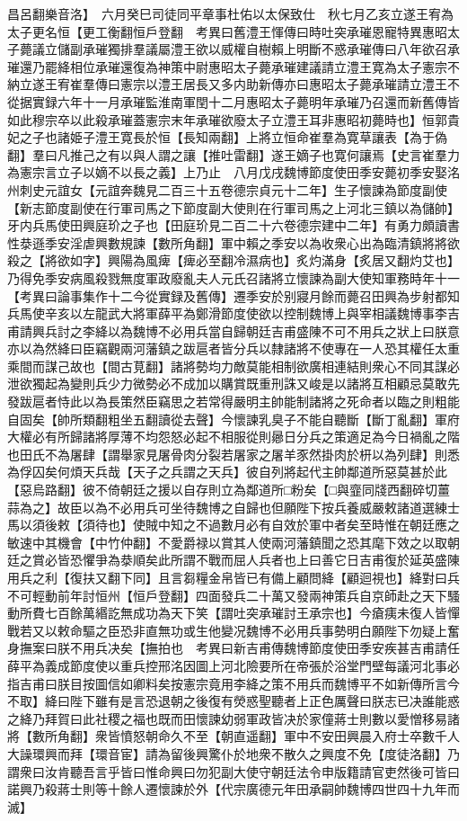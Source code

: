 昌呂翻樂音洛】　六月癸巳司徒同平章事杜佑以太保致仕　秋七月乙亥立遂王宥為太子更名恒【更工衡翻恒戶登翻　考異曰舊澧王惲傳曰時吐突承璀恩寵特異惠昭太子薨議立儲副承璀獨排羣議屬澧王欲以威權自樹賴上明斷不惑承璀傳曰八年欲召承璀還乃罷絳相位承璀還復為神策中尉惠昭太子薨承璀建議請立澧王寛為太子憲宗不納立遂王宥崔羣傳曰憲宗以澧王居長又多内助新傳亦曰惠昭太子薨承璀請立澧王不從据實録六年十一月承璀監淮南軍閏十二月惠昭太子薨明年承璀乃召還而新舊傳皆如此穆宗卒以此殺承璀蓋憲宗末年承璀欲廢太子立澧王耳非惠昭初薨時也】恒郭貴妃之子也諸姫子澧王寛長於恒【長知兩翻】上將立恒命崔羣為寛草讓表【為于偽翻】羣曰凡推己之有以與人謂之讓【推吐雷翻】遂王嫡子也寛何讓焉【史言崔羣力為憲宗言立子以嫡不以長之義】上乃止　八月戊戌魏博節度使田季安薨初季安娶洺州刺史元誼女【元誼奔魏見二百三十五卷德宗貞元十二年】生子懷諫為節度副使【新志節度副使在行軍司馬之下節度副大使則在行軍司馬之上河北三鎮以為儲帥】牙内兵馬使田興庭玠之子也【田庭玠見二百二十六卷德宗建中二年】有勇力頗讀書性㳟遜季安淫虐興數規諫【數所角翻】軍中賴之季安以為收衆心出為臨清鎮將將欲殺之【將欲如字】興陽為風痺【痺必至翻冷濕病也】炙灼滿身【炙居又翻灼艾也】乃得免季安病風殺戮無度軍政廢亂夫人元氏召諸將立懷諫為副大使知軍務時年十一【考異曰論事集作十二今從實録及舊傳】遷季安於别寢月餘而薨召田興為步射都知兵馬使辛亥以左龍武大將軍薛平為鄭滑節度使欲以控制魏博上與宰相議魏博事李吉甫請興兵討之李絳以為魏博不必用兵當自歸朝廷吉甫盛陳不可不用兵之狀上曰朕意亦以為然絳曰臣竊觀兩河藩鎮之跋扈者皆分兵以隸諸將不使專在一人恐其權任太重乘間而謀己故也【間古莧翻】諸將勢均力敵莫能相制欲廣相連結則衆心不同其謀必泄欲獨起為變則兵少力微勢必不成加以購賞既重刑誅又峻是以諸將互相顧忌莫敢先發跋扈者恃此以為長策然臣竊思之若常得嚴明主帥能制諸將之死命者以臨之則粗能自固矣【帥所類翻粗坐五翻讀從去聲】今懷諫乳臭子不能自聽斷【斷丁亂翻】軍府大權必有所歸諸將厚薄不均怨怒必起不相服從則曏日分兵之策適足為今日禍亂之階也田氏不為屠肆【謂舉家見屠骨肉分裂若屠家之屠羊豕然掛肉於枅以為列肆】則悉為俘囚矣何煩天兵哉【天子之兵謂之天兵】彼自列將起代主帥鄰道所惡莫甚於此【惡烏路翻】彼不倚朝廷之援以自存則立為鄰道所□粉矣【□與韲同牋西翻碎切薑蒜為之】故臣以為不必用兵可坐待魏博之自歸也但願陛下按兵養威嚴敕諸道選練士馬以須後敕【須待也】使賊中知之不過數月必有自效於軍中者矣至時惟在朝廷應之敏速中其機會【中竹仲翻】不愛爵禄以賞其人使兩河藩鎮聞之恐其麾下效之以取朝廷之賞必皆恐懼爭為㳟順矣此所謂不戰而屈人兵者也上曰善它日吉甫復於延英盛陳用兵之利【復扶又翻下同】且言芻糧金帛皆已有備上顧問絳【顧迴視也】絳對曰兵不可輕動前年討恒州【恒戶登翻】四面發兵二十萬又發兩神策兵自京師赴之天下騷動所費七百餘萬緡訖無成功為天下笑【謂吐突承璀討王承宗也】今瘡痍未復人皆憚戰若又以敕命驅之臣恐非直無功或生他變况魏博不必用兵事勢明白願陛下勿疑上奮身撫案曰朕不用兵决矣【撫拍也　考異曰新吉甫傳魏博節度使田季安疾甚吉甫請任薛平為義成節度使以重兵控邢洺因圖上河北險要所在帝張於浴堂門壁每議河北事必指吉甫曰朕目按圖信如卿料矣按憲宗竟用李絳之策不用兵而魏博平不如新傳所言今不取】絳曰陛下雖有是言恐退朝之後復有熒惑聖聽者上正色厲聲曰朕志已决誰能惑之絳乃拜賀曰此社稷之福也既而田懷諫幼弱軍政皆决於家僮蔣士則數以愛憎移易諸將【數所角翻】衆皆憤怒朝命久不至【朝直遥翻】軍中不安田興晨入府士卒數千人大譟環興而拜【環音宦】請為留後興驚仆於地衆不散久之興度不免【度徒洛翻】乃謂衆曰汝肯聽吾言乎皆曰惟命興曰勿犯副大使守朝廷法令申版籍請官吏然後可皆曰諾興乃殺蔣士則等十餘人遷懷諫於外【代宗廣德元年田承嗣帥魏博四世四十九年而滅】

